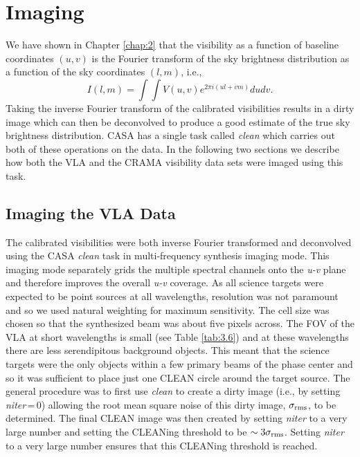 \section{Imaging}\label{sec:4.3}
We have shown in Chapter \ref{chap:2} that the visibility as a function of baseline coordinates $(u,v)$ is the Fourier transform of the sky brightness distribution as a function of the sky coordinates $(l,m)$, i.e.,
\begin{equation}
I(l,m)=\int \int V(u,v)e^{2\pi i(ul +vm)}dudv.
\end{equation}
Taking the inverse Fourier transform of the calibrated visibilities results in a dirty image which can then be deconvolved to produce a good estimate of the true sky brightness distribution. CASA has a single task called \textit{clean} which carries out both of these operations on the data. In the following two sections we describe how both the VLA and the CRAMA visibility data sets were imaged using this task.

\subsection{Imaging the VLA Data}\label{sec:4.3.1}

The calibrated visibilities were both inverse Fourier transformed and deconvolved using the CASA \textit{clean} task in multi-frequency synthesis imaging mode. This imaging mode separately grids the multiple spectral channels onto the \textit{u-v} plane and therefore improves the overall \textit{u-v} coverage. As all science targets were expected to be point sources at all wavelengths, resolution was not paramount and so we used natural weighting for maximum sensitivity. The cell size was chosen so that the synthesized beam was about five pixels across. The FOV of the VLA at short wavelengths is small (see Table \ref{tab:3.6}) and at these wavelengths there are less serendipitous background objects. This meant that the science targets were the only objects within a few primary beams of the phase center and so it was sufficient to place just one CLEAN circle around the target source. The general procedure was to first use \textit{clean} to create a dirty image (i.e., by setting \textit{niter}\,=\,0) allowing the root mean square noise of this dirty image, $\sigma _{\rm{rms}}$, to be determined. The final CLEAN image was then created by setting \textit{niter} to a very large number  and setting the CLEANing threshold to be $\sim 3\sigma _{\rm{rms}}$. Setting \textit{niter} to a very large number ensures that this CLEANing threshold is reached.

